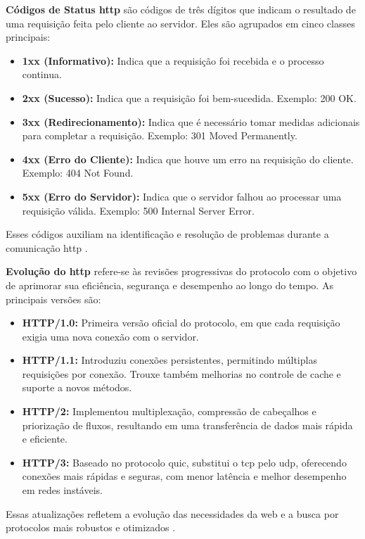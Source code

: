 \textbf{Códigos de Status \acrshort{http}} são códigos de três dígitos que indicam o resultado de uma requisição feita pelo cliente ao servidor. Eles são agrupados em cinco classes principais:

\begin{itemize}
    \item \textbf{1xx (Informativo):} Indica que a requisição foi recebida e o processo continua.
    \item \textbf{2xx (Sucesso):} Indica que a requisição foi bem-sucedida. Exemplo: 200 OK.
    \item \textbf{3xx (Redirecionamento):} Indica que é necessário tomar medidas adicionais para completar a requisição. Exemplo: 301 Moved Permanently.
    \item \textbf{4xx (Erro do Cliente):} Indica que houve um erro na requisição do cliente. Exemplo: 404 Not Found.
    \item \textbf{5xx (Erro do Servidor):} Indica que o servidor falhou ao processar uma requisição válida. Exemplo: 500 Internal Server Error.
\end{itemize}

Esses códigos auxiliam na identificação e resolução de problemas durante a comunicação \acrshort{http} \cite{mdn_http}.


\textbf{Evolução do \acrshort{http}} refere-se às revisões progressivas do protocolo com o objetivo de aprimorar sua eficiência, segurança e desempenho ao longo do tempo. As principais versões são:

\begin{itemize}
    \item \textbf{HTTP/1.0:} Primeira versão oficial do protocolo, em que cada requisição exigia uma nova conexão com o servidor.
    \item \textbf{HTTP/1.1:} Introduziu conexões persistentes, permitindo múltiplas requisições por conexão. Trouxe também melhorias no controle de cache e suporte a novos métodos.
    \item \textbf{HTTP/2:} Implementou multiplexação, compressão de cabeçalhos e priorização de fluxos, resultando em uma transferência de dados mais rápida e eficiente.
    \item \textbf{HTTP/3:} Baseado no protocolo \acrshort{quic}, substitui o \acrshort{tcp} pelo \acrshort{udp}, oferecendo conexões mais rápidas e seguras, com menor latência e melhor desempenho em redes instáveis.
\end{itemize}

Essas atualizações refletem a evolução das necessidades da web e a busca por protocolos mais robustos e otimizados \cite{cloudflare_http}.


